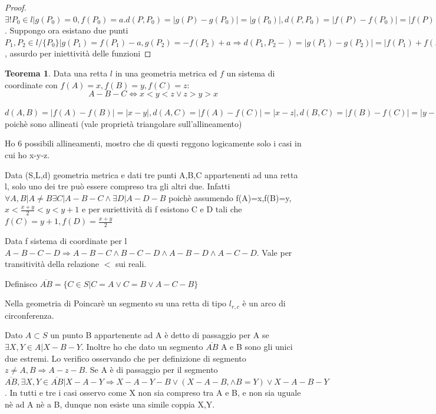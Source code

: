 \documentclass[a4paper,10pt]{article}
\theoremstyle{definition}
\theoremstyle{indentdefinition}
\theoremstyle{indentpostulate}
\theoremstyle{indenttheorem}
\newtheorem{thm}{Teorema}[section]
\theoremstyle{myremark}
\theoremstyle{indentgeneral}
\begin{document}
\begin{proof}  $\exists ! P_0 \in l|g(P_0)=0,f(P_0)=a. d(P,P_0)=|g(P)-g(P_0)|=|g(P_0)|, d(P,P_0)=|f(P)-f(P_0)|=|f(P)-a|\Rightarrow |g(P)|=|f(P)-a|\Rightarrow g(P)= \epsilon *(f(P)-a)$. Suppongo ora esistano due punti $P_1,P_2 \in l/ \{ P_0 \} | g(P_1)=f(P_1)-a,g(P_2)=-f(P_2)+a \Rightarrow d(P_1,P_2-)=|g(P_1)-g(P_2)|=|f(P_1)+f(P_2)-2a|=|f(P_1)-f(P_2)|\Rightarrow f(P_2)=a,f(P_1)=0\lor f(P_2)=0, f(P_1)=a \Rightarrow \exists P| f(P)=f(P_0)$, assurdo per iniettività delle funzioni    \end{proof} 



\begin{thm}   Data una retta $l$ in una geometria metrica ed $f$ un sistema di coordinate con $f(A)=x,f(B)=y,f(C)=z$: $$A-B-C \iff x<y<z\lor z>y>x$$   \end{thm} 

$d(A,B)=|f(A)-f(B)|=|x-y|, d(A,C)=|f(A)-f(C)|=|x-z|, d(B,C)=|f(B)-f(C)|=|y-z| \Rightarrow |x-z|=|x-y|+|y-z|$ poichè sono allineati (vale proprietà triangolare sull'allineamento)

Ho 6 possibili allineamenti, mostro che di questi reggono logicamente solo i casi in cui ho x-y-z.

Data (S,L,d) geometria metrica e dati tre punti A,B,C appartenenti ad una retta l, solo uno dei tre può essere compreso tra gli altri due. Infatti $\forall A,B| A \neq B \exists C | A-B-C \land \exists D |A-D-B$ poichè assumendo f(A)=x,f(B)=y, $x<\frac{x+y}{2}<y<y+1$ e per suriettività di f esistono C e D tali che $f(C)=y+1,f(D)=\frac{x+y}{2}$

Data f sistema di coordinate per l $A-B-C-D \Rightarrow A-B-C \land B-C-D \land A-B-D \land A-C-D$. Vale per transitività della relazione $<$ sui reali.

Definisco $\overline{AB}=\{ C \in S| C=A \lor C=B \lor A-C-B \}$

Nella geometria di Poincarè un segmento su una retta di tipo $l_{r,c}$ è un arco di circonferenza.

Dato $A \subset S$ un punto B appartenente ad A è detto di passaggio per A se $\exists X,Y \in A|X-B-Y$. Inoltre ho che dato un segmento $\overline{AB}$ A e B sono gli unici due estremi. Lo verifico osservando che per definizione di segmento $z \neq A,B \Rightarrow A-z-B$. Se A è di passaggio per il segmento $\overline{AB}, \exists X,Y \in \overline{AB}|X-A-Y \Rightarrow X-A-Y-B \lor  (X-A-B, \land B=Y) \lor X-A-B-Y$. In tutti e tre i casi osservo come X non sia compreso tra A e B, e non sia uguale nè ad A nè a B, dunque non esiste una simile coppia X,Y.
\end{document}
